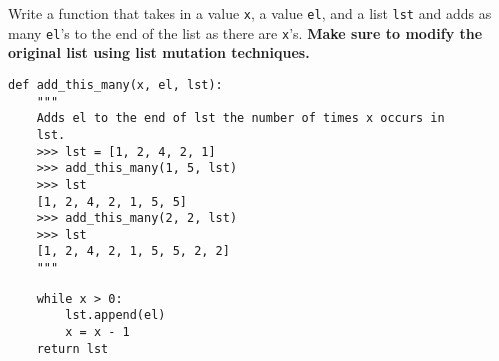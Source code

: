 \begin{blocksection}
\question Write a function that takes in a value \lstinline$x$, a value \lstinline$el$, and a list \lstinline$lst$ and adds as many \lstinline$el$’s to the end of the list as there are \lstinline$x$’s. \textbf{Make sure to modify the original list using list mutation techniques.} 

\begin{lstlisting}
def add_this_many(x, el, lst):
    """ 
    Adds el to the end of lst the number of times x occurs in 
    lst.
    >>> lst = [1, 2, 4, 2, 1]
    >>> add_this_many(1, 5, lst)
    >>> lst
    [1, 2, 4, 2, 1, 5, 5]
    >>> add_this_many(2, 2, lst)
    >>> lst
    [1, 2, 4, 2, 1, 5, 5, 2, 2]
    """
\end{lstlisting}
\vspace{.65in}
\begin{solution}[0.75in]
\begin{lstlisting}
    while x > 0:
        lst.append(el)
        x = x - 1
    return lst

\end{lstlisting}
\end{solution}
\end{blocksection}
